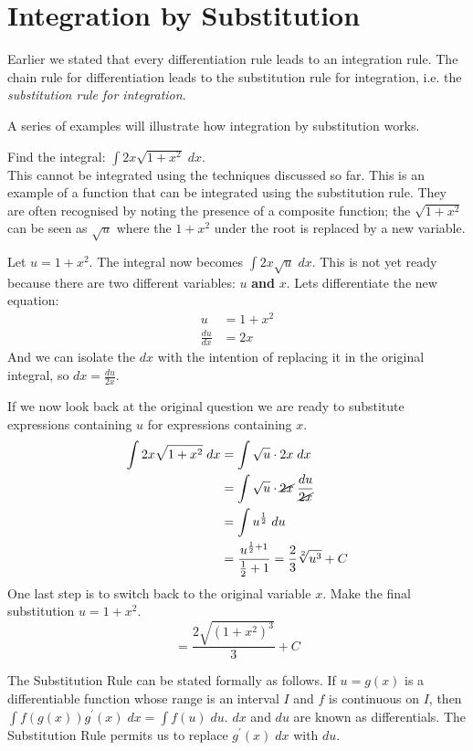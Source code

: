 \section{Integration by Substitution}
Earlier we stated that every differentiation rule leads to an integration rule. The chain rule for differentiation leads to the substitution rule for integration, i.e. the \emph{substitution rule for integration}. 

A series of examples will illustrate how integration by substitution works.

\example Find the integral: $\int 2 x \sqrt{1 +x^{2}}\; d x$.\medskip\\
\solution This cannot be integrated using the techniques discussed so far. This is an example of a function that can be integrated using the substitution rule. They are often recognised by noting the presence of a composite function; the $\sqrt{1 +x^{2}}$ can be seen as $\sqrt{u}$ where the $1+x^2$ under the root is replaced by a new variable.

Let $u=1+x^2$. The integral now becomes $\int 2x\sqrt{u}\; dx$. This is not yet ready because there are two different variables: $u$ \textbf{and} $x$. Lets differentiate the new equation:
\begin{align*}
u&=1+x^2\\
\frac{du}{dx}&=2x
\end{align*}
And we can isolate the $dx$ with the intention of replacing it in the original integral, so $\displaystyle dx=\frac{du}{2x}$.

If we now look back at the original question we are ready to substitute expressions containing $u$ for expressions containing $x$.
\begin{align*}
\int 2 x \sqrt{1 +x^{2}}\; d x &  = \int \sqrt{u} \cdot 2 x\; d x \\
 &  = \int \sqrt{u}\cdot \cancel{2x}\; \frac{du}{\cancel{2x}}\\
 &  = \int u^{\frac{1}{2}}\; d u \\
 &  = \frac{u^{\frac{1}{2} +1}}{\frac{1}{2} +1}= \frac{2}{3}\sqrt[2]{u^3}+C
 \end{align*}
 One last step is to switch back to the original variable $x$. Make the final substitution $u=1+x^2$.
 \[ = \frac{2 \sqrt{\left (1 +x^{2}\right )^{3}}}{3} +C \]
 
The Substitution Rule can be stated formally as follows. If $u =g (x)$ is a differentiable function whose range is an interval $I$ and $f$ is continuous on $I$, then $\int f \left (g \left (x\right )\right ) g^{ \prime } \left (x\right )\; d x =\int f \left (u\right )\; d u$. $d x$ and $d u$ are known as differentials. The Substitution Rule permits us to replace $g^{ \prime } \left (x\right )\; d x$ with $d u$. 

